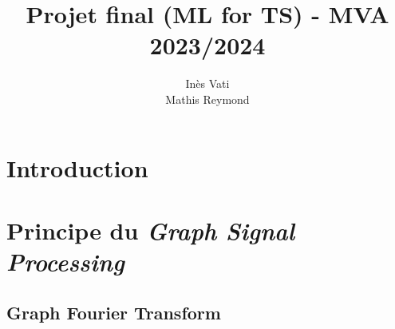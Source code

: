 \documentclass[11pt]{article}
\title{Projet final (ML for TS) - MVA 2023/2024}
\author{
Inès Vati \email{ines.vati@eleves.enpc.fr} \\ %
Mathis Reymond \email{mathis.reymond74@gmail.com} %
}
\begin{document}
\maketitle

\section{Introduction}

\section{Principe du \textit{Graph Signal Processing}}
\subsection{Graph Fourier Transform}
\end{document}
